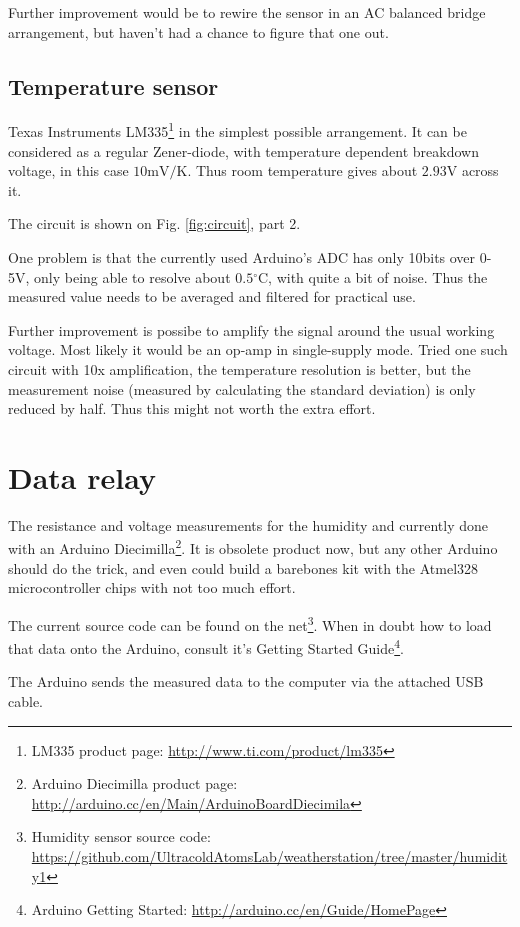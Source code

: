 \documentclass[12pt,a4paper]{article}
\begin{document}
Further improvement would be to rewire the sensor in an AC balanced bridge arrangement, but haven't had a chance to figure that one out.

\subsection{Temperature sensor}

Texas Instruments LM335\footnote{LM335 product page: \url{http://www.ti.com/product/lm335}} in the simplest possible arrangement. It can be considered as a regular Zener-diode, with temperature dependent breakdown voltage, in this case $10\mathrm{mV}/\mathrm{K}$. Thus room temperature gives about $2.93\mathrm{V}$ across it.

The circuit is shown on Fig. \ref{fig:circuit}, part 2.

One problem is that the currently used Arduino's ADC has only 10bits over 0-5V, only being able to resolve about $0.5\mathrm{^\circ C}$, with quite a bit of noise. Thus the measured value needs to be averaged and filtered for practical use.

Further improvement is possibe to amplify the signal around the usual working voltage. Most likely it would be an op-amp in single-supply mode. Tried one such circuit with 10x amplification, the temperature resolution is better, but the measurement noise (measured by calculating the standard deviation) is only reduced by half. Thus this might not worth the extra effort.

\section{Data relay}

The resistance and voltage measurements for the humidity and currently done with an Arduino Diecimilla\footnote{Arduino Diecimilla product page: \url{http://arduino.cc/en/Main/ArduinoBoardDiecimila}}. It is obsolete product now, but any other Arduino should do the trick, and even could build a barebones kit with the Atmel328 microcontroller chips with not too much effort.

The current source code can be found on the net\footnote{Humidity sensor source code: \url{https://github.com/UltracoldAtomsLab/weatherstation/tree/master/humidity1}}. When in doubt how to load that data onto the Arduino, consult it's Getting Started Guide\footnote{Arduino Getting Started: \url{http://arduino.cc/en/Guide/HomePage}}.

The Arduino sends the measured data to the computer via the attached USB cable.
\end{document}
